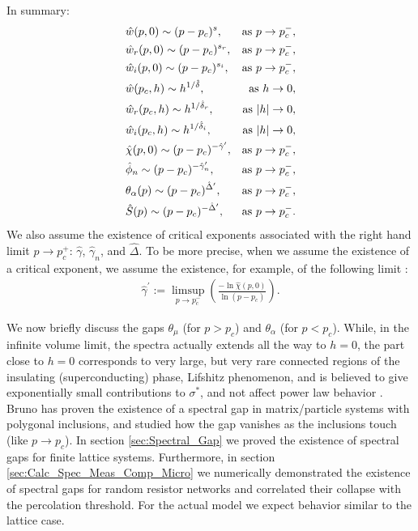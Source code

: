 \documentclass[english,12pt]{ttuthes}
\newcommand{\ph}{\hat{\phi}}
\newcommand{\gh}{\hat{\gamma}}
\newcommand{\Dh}{\hat{\Delta}}
\newcommand{\dha}{\hat{\delta}}
\begin{document}
In summary:
%
\begin{eqnarray}\label{eq:Crit_Exponents_wh}
  &\hat{w}(p,0)\sim(p-p_c)^s,  &\text{as } p \to p_c^-,\\
  &\hat{w}_r(p,0)\sim(p-p_c)^{s_r}, &\text{as  } p \to p_c^-,\notag\\
  &\hat{w}_i(p,0)\sim(p-p_c)^{s_i}, &\text{as  } p \to p_c^-,\notag\\                     
  &\hat{w}(p_c,h)\sim h^{1/ \dha }, &\text{as } h \to 0, \notag\\
 &\hat{w}_r(p_c,h)\sim h^{1/ \dha_r },&\text{as } |h| \to 0, \notag\\
 &\hat{w}_i(p_c,h)\sim h^{1/ \dha_i }, &\text{as } |h| \to 0, \notag\\            
 &\hat{\chi}(p,0)\sim(p-p_c)^{-\gh^\prime}, &\text{as }  p\to p_c^-, \notag\\             
  &\ph_n\sim(p-p_c)^{-\gh_n^\prime}, &\text{as }  p\to p_c^-, \notag\\
  &\theta_\alpha(p)\sim(p-p_c)^{\Dh^\prime},  &\text{as }  p\to p_c^-,\notag\\
  &\hat{S}(p)\sim(p-p_c)^{-\Dh^\prime}, &\text{as } p \to p_c^-.\notag
\end{eqnarray} 
%
We also assume the existence of critical exponents associated with the
right hand limit $p\to p_c^+$: $\gh$, $\gh_n$, and $\Dh$. To be more precise,
when we assume the existence of a critical exponent, we assume the
existence, for example, of the following limit \cite{Baker-1990}:
% 
\begin{align}
  \gh^\prime:=\limsup_{p\to p_c^-}\left( \frac{-\ln \hat{\chi}(p,0)}{\ln(p-p_c)}  \right).
\end{align}
%

We now briefly discuss the gaps $\theta_\mu$ (for $p>p_c$)  and $\theta_\alpha$ (for
$p<p_c$). While, in the infinite volume limit, the spectra
actually extends all the way to $h=0$, the part close to $h=0$
corresponds to very large, but very rare connected regions of the
insulating (superconducting) phase, Lifshitz phenomenon, and is
believed to give exponentially small contributions to $\sigma^*$, and not
affect power law behavior \cite{Golden:PRL-3935}. Bruno
\cite{Bruno:PRSLA-353} has proven the existence of a spectral gap in
matrix/particle systems with polygonal inclusions, and studied how the
gap vanishes as the inclusions touch (like $p\to p_c$). In section
\ref{sec:Spectral_Gap} we proved the existence of spectral gaps for
finite lattice systems. Furthermore, in section
\ref{sec:Calc_Spec_Meas_Comp_Micro} we numerically demonstrated the
existence of spectral gaps for random resistor networks and correlated
their collapse with the percolation threshold. For the actual model we
expect behavior similar to the lattice case.
%
\end{document}
